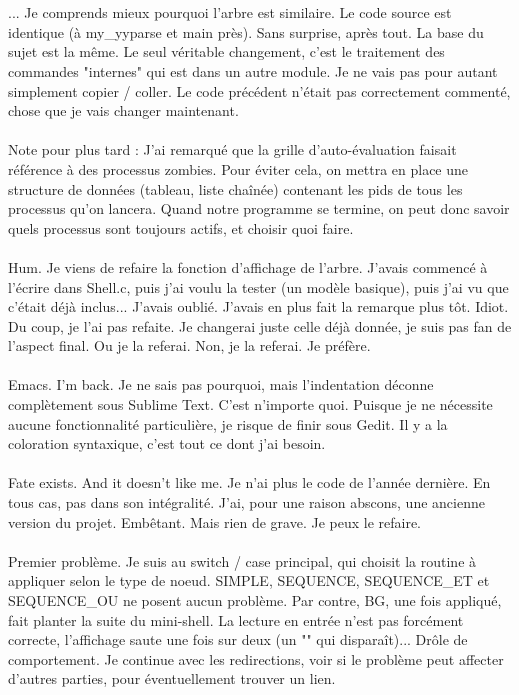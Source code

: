 \\\\
... Je comprends mieux pourquoi l'arbre est similaire. Le code source est identique (à my\_yyparse et main près). Sans surprise, après tout. La base du sujet est la même. Le seul véritable changement, c'est le traitement des commandes "internes" qui est dans un autre module. Je ne vais pas pour autant simplement copier / coller. Le code précédent n'était pas correctement commenté, chose que je vais changer maintenant.
\\\\
Note pour plus tard : J'ai remarqué que la grille d'auto-évaluation faisait référence à des processus zombies. Pour éviter cela, on mettra en place une structure de données (tableau, liste chaînée) contenant les pids de tous les processus qu'on lancera. Quand notre programme se termine, on peut donc savoir quels processus sont toujours actifs, et choisir  quoi faire.
\\\\
Hum. Je viens de refaire la fonction d'affichage de l'arbre. J'avais commencé à l'écrire dans Shell.c, puis j'ai voulu la tester (un modèle basique), puis j'ai vu que c'était déjà inclus... J'avais oublié. J'avais en plus fait la remarque plus tôt. Idiot. Du coup, je l'ai pas refaite. Je changerai juste celle déjà donnée, je suis pas fan de l'aspect final. Ou je la referai. Non, je la referai. Je préfère.
\\\\
Emacs. I'm back. Je ne sais pas pourquoi, mais l'indentation déconne complètement sous Sublime Text. C'est n'importe quoi. Puisque je ne nécessite aucune fonctionnalité particulière, je risque de finir sous Gedit. Il y a la coloration syntaxique, c'est tout ce dont j'ai besoin.
\\\\
Fate exists. And it doesn't like me. Je n'ai plus le code de l'année dernière. En tous cas, pas dans son intégralité. J'ai, pour une raison abscons, une ancienne version du projet. Embêtant. Mais rien de grave. Je peux le refaire.
\\\\
Premier problème. Je suis au switch / case principal, qui choisit la routine à appliquer selon le type de noeud. SIMPLE, SEQUENCE, SEQUENCE\_ET et SEQUENCE\_OU ne posent aucun problème. Par contre, BG, une fois appliqué, fait planter la suite du mini-shell. La lecture en entrée n'est pas forcément correcte, l'affichage saute une fois sur deux (un "" qui disparaît)... Drôle de comportement. Je continue avec les redirections, voir si le problème peut affecter d'autres parties, pour éventuellement trouver un lien.
